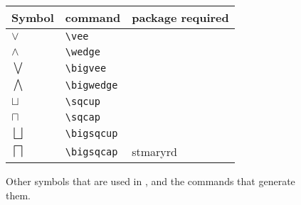 \documentclass[12pt]{article}
\begin{document}
\begin{figure}[p]
  \begin{center}
      \begin{tabular}{|l|l|l|}\hline
Symbol&command&package required\\\hline
$\vee$&\verb|\vee|&\\
$\wedge$&\verb|\wedge|&\\
$\bigvee$&\verb|\bigvee|&\\
$\bigwedge$&\verb|\bigwedge|&\\
$\sqcup$&\verb|\sqcup|&\\
$\sqcap$&\verb|\sqcap|&\\
$\bigsqcup$&\verb|\bigsqcup|&\\
$\bigsqcap$&\verb|\bigsqcap|&stmaryrd\\\hline
\end{tabular}
\caption{Other symbols that are used in \FCA, and the commands that generate
  them.}\label{fig:2}\end{center} 
\end{figure}
%
\end{document}
